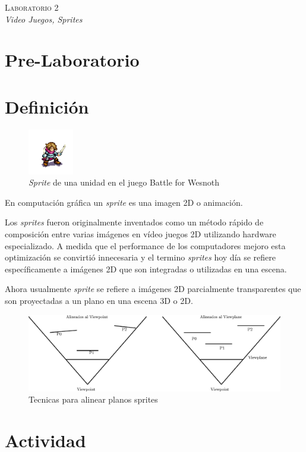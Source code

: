 \begin{center}
\textsc{\Large Laboratorio 2}~\\
\emph{\large Video Juegos, Sprites}
\end{center}

\section{Pre-Laboratorio}

\section{Definición}
\begin{figure}
\includegraphics[width=75px]{semana2/sprite_ej1.png} 
\caption{\emph{Sprite} de una unidad en el juego Battle for Wesnoth \cite{wesnothgame}}
\end{figure}

En computación gráfica un \emph{sprite} es una imagen 2D o animación.

Los \emph{sprites} fueron originalmente inventados como un método rápido de composición entre varias imágenes en vídeo juegos 2D utilizando hardware especializado. A medida que el performance de los computadores mejoro esta optimización se convirtió innecesaria y el termino \emph{sprites} hoy día se refiere específicamente a imágenes 2D que son integradas o utilizadas en una escena.

Ahora usualmente \emph{sprite} se refiere a imágenes 2D parcialmente transparentes que son proyectadas a un plano en una escena 3D o 2D.
\begin{figure}[H]
\centering
\includegraphics[width=0.9\linewidth]{semana2/bills.eps} 
\caption{Tecnicas para alinear planos sprites}
\end{figure}

\section{Actividad}
